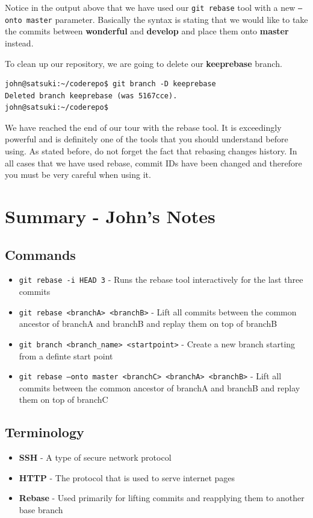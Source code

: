 Notice in the output above that we have used our \texttt{git rebase} tool with a new \texttt{--onto master} parameter.  Basically the syntax is stating that we would like to take the commits between \textbf{wonderful} and \textbf{develop} and place them onto \textbf{master} instead.

To clean up our repository, we are going to delete our \textbf{keeprebase} branch.

\begin{Verbatim}
john@satsuki:~/coderepo$ git branch -D keeprebase
Deleted branch keeprebase (was 5167cce).
john@satsuki:~/coderepo$ 
\end{Verbatim}

We have reached the end of our tour with the rebase tool.  It is exceedingly powerful and is definitely one of the tools that you should understand before using.  As stated before, do not forget the fact that rebasing changes history.  In all cases that we have used rebase, commit IDs have been changed and therefore you must be very careful when using it.

\clearpage

\section{Summary - John's Notes}
\subsection{Commands}
\begin{itemize}

\item\texttt{git rebase -i HEAD~3} - Runs the rebase tool interactively for the last three commits 

\item\texttt{git rebase <branchA> <branchB>} - Lift all commits between the common ancestor of branchA and branchB and replay them on top of branchB

\item\texttt{git branch <branch\_name> <startpoint>} - Create a new branch starting from a definte start point

\item\texttt{git rebase --onto master <branchC> \newline <branchA> <branchB>} - Lift all commits between the common ancestor of branchA and branchB and replay them on top of branchC
\end{itemize}

\subsection{Terminology}
\begin{itemize}
\item\textbf{SSH} - A type of secure network protocol
\item\textbf{HTTP} - The protocol that is used to serve internet pages
\item\textbf{Rebase} - Used primarily for lifting commits and reapplying them to another base branch
\end{itemize}
